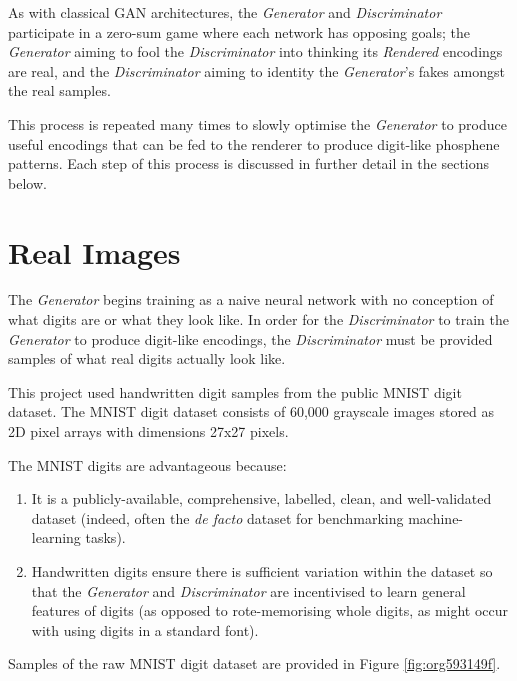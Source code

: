 \documentclass[11pt]{book}
\begin{document}
As with classical GAN architectures, the \emph{Generator} and \emph{Discriminator} participate in a zero-sum game where each network has opposing goals; the \emph{Generator} aiming to fool the \emph{Discriminator} into thinking its \emph{Rendered} encodings are real, and the \emph{Discriminator} aiming to identity the \emph{Generator}'s fakes amongst the real samples.

This process is repeated many times to slowly optimise the \emph{Generator} to produce useful encodings that can be fed to the renderer to produce digit-like phosphene patterns.
Each step of this process is discussed in further detail in the sections below.

\section*{Real Images}
\label{sec:org79c4924}

The \emph{Generator} begins training as a naive neural network with no conception of what digits are or what they look like.
In order for the \emph{Discriminator} to train the \emph{Generator} to produce digit-like encodings, the \emph{Discriminator} must be provided samples of what real digits actually look like.

This project used handwritten digit samples from the public MNIST digit dataset. \cite{Lecun1998}
The MNIST digit dataset consists of 60,000 grayscale images stored as 2D pixel arrays with dimensions 27x27 pixels.

The MNIST digits are advantageous because:
\begin{enumerate}
\item It is a publicly-available, comprehensive, labelled, clean, and well-validated dataset (indeed, often the \emph{de facto} dataset for benchmarking machine-learning tasks).
\item Handwritten digits ensure there is sufficient variation within the dataset so that the \emph{Generator} and \emph{Discriminator} are incentivised to learn general features of digits (as opposed to rote-memorising whole digits, as might occur with using digits in a standard font).
\end{enumerate}

Samples of the raw MNIST digit dataset are provided in Figure \ref{fig:org593149f}.
\end{document}
